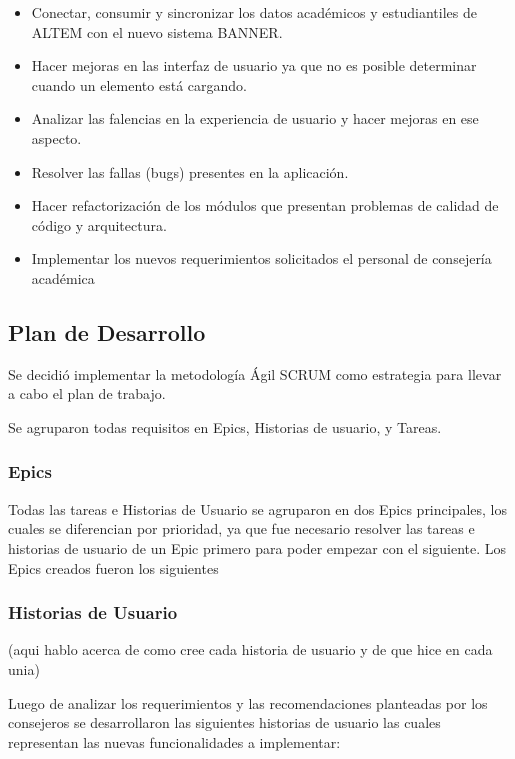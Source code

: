 \begin{itemize}
    \item Conectar, consumir y sincronizar los datos académicos y estudiantiles de ALTEM con el nuevo sistema BANNER.
    \item Hacer mejoras en las interfaz de usuario ya que no es posible determinar cuando un elemento está cargando.
    \item Analizar las falencias en la experiencia de usuario y hacer mejoras en ese aspecto.
    \item Resolver las fallas (bugs) presentes en la aplicación.
    \item Hacer refactorización de los módulos que presentan problemas de calidad de código y arquitectura.
    \item Implementar los nuevos requerimientos solicitados el personal de consejería académica
\end{itemize}

\subsection{Plan de Desarrollo}
Se decidió implementar la metodología Ágil SCRUM como estrategia para llevar a cabo el plan de trabajo.

Se agruparon todas requisitos en Epics, Historias de usuario, y Tareas.

\subsubsection{Epics}
Todas las tareas e Historias de Usuario se agruparon en dos Epics principales, los cuales se diferencian por prioridad, ya que fue necesario resolver las tareas e historias de usuario de un Epic primero para poder empezar con el siguiente.
Los Epics creados fueron los siguientes

\subsubsection{Historias de Usuario}
(aqui hablo acerca de como cree cada historia de usuario y de que hice en cada unia)

Luego de analizar los requerimientos y las recomendaciones planteadas por los consejeros se desarrollaron las siguientes historias de usuario las cuales representan las nuevas funcionalidades a implementar:


